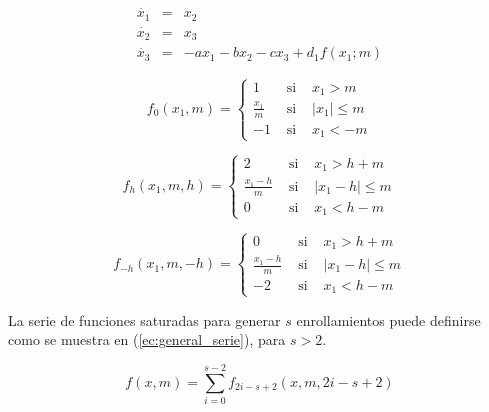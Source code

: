 \documentclass[10pt,a4paper]{article}
\begin{document}
	\begin{equation} 
		\begin{array}{lcl}
		\dot{x_{1}} & = & x_{2} \\
		\dot{x_{2}} & = & x_{3}\\
		\dot{x_{3}} & = & -a x_{1} - b x_{2} -c x_{3} + d_{1} f(x_{1};m)
		\end{array}
		\label{ec:oscilador}
	\end{equation}


\begin{equation} 
	f_{0}(x_{1},m)= \left\{ \begin{array}{lcl}
	1 & \text{ si } & x_{1} > m \\
	\frac{x_{1}}{m}& \text{ si } & |x_{1}| \leq m\\
	-1 & \text{ si } & x_{1} < -m
	\end{array}
	\right.
	\label{ec:f0}
\end{equation}


\begin{equation} 
	f_{h}(x_{1},m,h)= \left\{ \begin{array}{lcl}
	2 & \text{ si } & x_{1} > h + m \\
	\frac{x_{1}-h}{m}& \text{ si } & |x_{1} - h| \leq m\\
	0 & \text{ si } & x_{1} < h-m
	\end{array}
	\right.
		\label{ec:fh}
\end{equation}

\begin{equation} 
	f_{-h}(x_{1},m,-h)= \left\{ \begin{array}{lcl}
	0 & \text{ si } & x_{1} > h + m \\
	\frac{x_{1}-h}{m}& \text{ si } & |x_{1} - h| \leq m\\
	-2 & \text{ si } & x_{1} < h-m
	\end{array}
	\right.
		\label{ec:f-h}
\end{equation}


La serie de funciones saturadas para generar $s$ enrollamientos puede definirse como se muestra en (\ref{ec:general_serie}), para $s > 2$.

\begin{equation}
f(x,m) = \sum_{i=0}^{s-2} f_{2i-s+2}(x,m,2i-s+2)
\label{ec:general_serie}
\end{equation}
\end{document}
